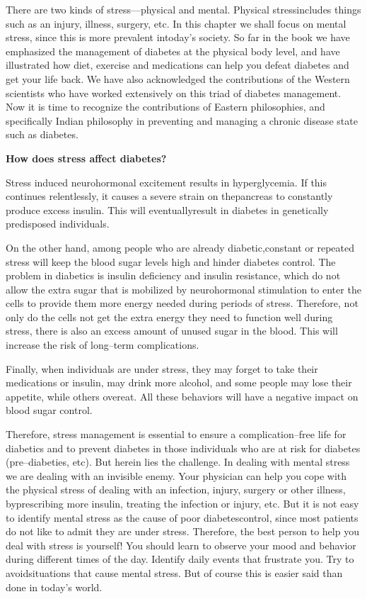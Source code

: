 There are two kinds of stress—physical and mental. Physical stress\break includes things such as an injury, illness, surgery, etc. In this chapter we shall focus on mental stress, since this is more prevalent in\break today’s society. So far in the book we have emphasized the management of diabetes at the physical body level, and have illustrated how diet, exercise and medications can help you defeat diabetes and get your life back. We have also acknowledged the contributions of the Western scientists who have worked extensively on this triad of diabetes management. Now it is time to recognize the contributions of Eastern philosophies, and specifically Indian philosophy in preventing and managing a chronic disease state such as diabetes.

\noindent\textbf{How does stress affect diabetes?}

Stress induced neurohormonal excitement results in hypergly\-ce\-mia. If this continues relentlessly, it causes a severe strain on the\break pancreas to constantly produce excess insulin. This will eventually\break result in diabetes in genetically predisposed individuals.

On the other hand, among people who are already diabetic,\break constant or repeated stress will keep the blood sugar levels high and hinder diabetes control. The problem in diabetics is insulin deficiency and insulin resistance, which do not allow the extra sugar that is mobilized by neurohormonal stimulation to enter the cells to provide them more energy needed during periods of stress. Therefore, not only do the cells not get the extra energy they need to function well during stress, there is also an excess amount of unused sugar in the blood. This will increase the risk of long–term complications.

Finally, when individuals are under stress, they may forget to take their medications or insulin, may drink more alcohol, and some people may lose their appetite, while others overeat. All these behaviors will have a negative impact on blood sugar control.

Therefore, stress management is essential to ensure a complica\-tion–free life for diabetics and to prevent diabetes in those indivi\-duals who are at risk for diabetes (pre–diabeties, etc). But herein lies the challenge. In dealing with mental stress we are dealing with an invisible enemy. Your physician can help you cope with the physical stress of dealing with an infection, injury, surgery or other illness, by\break prescribing more insulin, treating the infection or injury, etc. But it is not easy to identify mental stress as the cause of poor diabetes\break control, since most patients do not like to admit they are under stress. Therefore, the best person to help you deal with stress is yourself! You should learn to observe your mood and behavior during different times of the day. Identify daily events that frustrate you. Try to avoid\break situations that cause mental stress. But of course this is easier said than done in today’s world.

